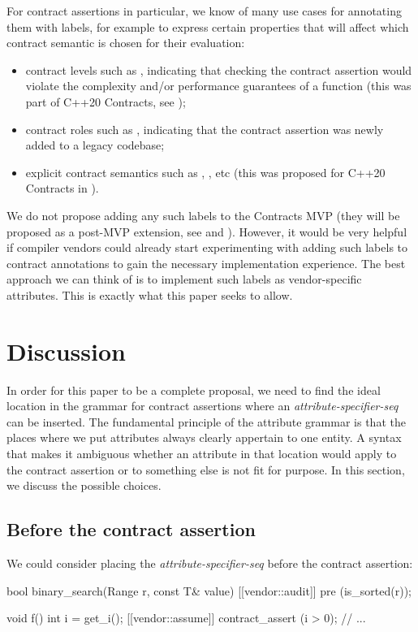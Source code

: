 For contract assertions in particular, we know of many use cases for annotating them with labels, for example to express certain properties that will affect which contract semantic is chosen for their evaluation:
\begin{itemize}
\item contract levels such as , indicating that checking the contract assertion would violate the complexity and/or performance guarantees of a function (this was part of C++20 Contracts, see \cite{P0542R5});
\item contract roles such as , indicating that the contract assertion was newly added to a legacy codebase;
\item explicit contract semantics such as , , etc (this was proposed for C++20 Contracts in \cite{P1429R3}).
\end{itemize}

We do not propose adding any such labels to the Contracts MVP (they will be proposed as a post-MVP extension, see \cite{P2755R0} and \cite{P2885R3}). However, it would be very helpful if compiler vendors could already start experimenting with adding such labels to contract annotations to gain the necessary implementation experience. The best approach we can think of is to implement such labels as vendor-specific attributes. This is exactly what this paper seeks to allow.

\section{Discussion}

In order for this paper to be a complete proposal, we need to find the ideal location in the grammar for contract assertions where an \emph{attribute-specifier-seq} can be inserted. The fundamental principle of the attribute grammar is that the places where we put attributes always clearly appertain to one entity. A syntax that makes it ambiguous whether an attribute in that location would apply to the contract  assertion or to something else is not fit for purpose. In this section, we discuss the possible choices.

\subsection{Before the contract assertion}

We could consider placing the \emph{attribute-specifier-seq} before the contract assertion:
\begin{codeblock}
bool binary_search(Range r, const T& value)
  [[vendor::audit]] pre (is_sorted(r));
  
void f() {
  int i = get_i();
  [[vendor::assume]] contract_assert (i > 0);
  // ...
}
\end{codeblock}

